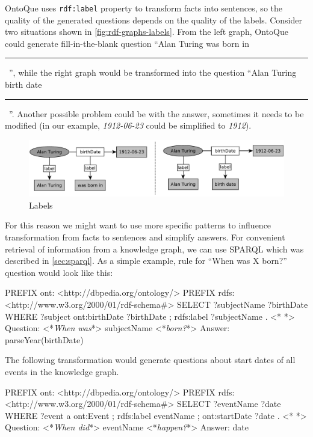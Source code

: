 \documentclass[12pt, twoside]{fithesis2}
\renewcommand{\_}{\leavevmode \kern0.07em\vbox{\hrule width0.4em}}
\newcommand{\arrowlinesplit}{%
  \noindent\makebox[\linewidth]{\raisebox{0.15em}{\rule{0.478\textwidth}{0.5pt}}%
  ~$\downarrow$~%
  \noindent\raisebox{0.15em}{\rule{0.478\textwidth}{0.5pt}}}%
}
\newcommand{\sentenceGap}{\rule{1.5cm}{0.4pt}~}
\begin{document}
OntoQue uses \texttt{rdf:label} property to transform facts into sentences,
so the quality of the generated questions depends on the quality of the labels.
Consider two situations shown in \autoref{fig:rdf-graphs-labels}.
From the left graph, OntoQue could generate fill-in-the-blank question
``Alan Turing was born in \sentenceGap'',
while the right graph would be transformed into the question
``Alan Turing birth date \sentenceGap''.
Another possible problem could be with the answer, sometimes it needs to be modified
(in our example, \emph{1912-06-23} could be simplified to \emph{1912}).

\begin{figure}[h]
  \centering
  \includegraphics[width=\textwidth]{images/rdf-graph-labels-comparision.pdf}
  \caption{Labels}
  \label{fig:rdf-graphs-labels}
\end{figure}

For this reason we might want to use more specific patterns to influence transformation from facts to sentences and simplify answers. For convenient retrieval of information from a knowledge graph, we can use SPARQL which was described in \autoref{sec:sparql}.
As a simple example, rule for ``When was X born?'' question would look like this:
\begin{code}
PREFIX ont: <http://dbpedia.org/ontology/>
PREFIX rdfs: <http://www.w3.org/2000/01/rdf-schema#>
SELECT ?subjectName ?birthDate
WHERE {
  ?subject ont:birthDate ?birthDate ;
      rdfs:label ?subjectName .
}
<*\arrowlinesplit*>
Question: <*\emph{When was}*> subjectName <*\emph{born?}*>
Answer: parseYear(birthDate)
\end{code}

\noindent
The following transformation would generate questions about start dates of all events in the knowledge graph.
\begin{code}
PREFIX ont: <http://dbpedia.org/ontology/>
PREFIX rdfs: <http://www.w3.org/2000/01/rdf-schema#>
SELECT ?eventName ?date
WHERE {
  ?event a ont:Event ;
    rdfs:label eventName ;
    ont:startDate ?date .
}
<*\arrowlinesplit*>
Question: <*\emph{When did}*> eventName <*\emph{happen?}*>
Answer: date
\end{code}
\end{document}
